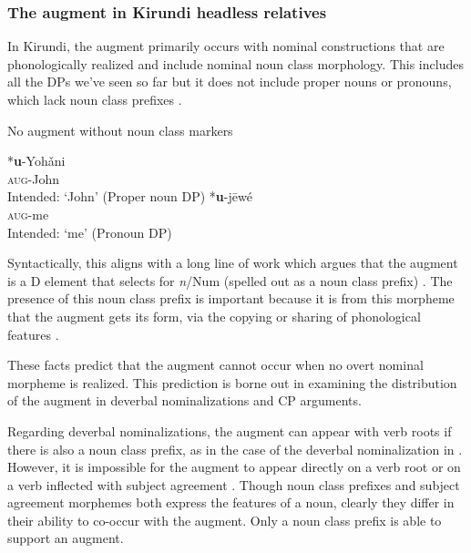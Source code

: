 \documentclass[output=paper,colorlinks,citecolor=brown
]{langscibook}
\begin{document}
 \subsubsection{The augment in Kirundi headless relatives}

In Kirundi, the augment primarily occurs with nominal constructions that are phonologically realized and include nominal noun class morphology. This includes all the DPs we've seen so far but it does not include proper nouns or pronouns, which lack noun class prefixes .

\ea No augment without noun class markers \label{ex:myers:noaugnonc}
\begin{xlist}
\ex \gll {}*{\bfseries  u}-Yohǎni\\
\textsc{aug}-John\\
\glt {}Intended: `John' \hfill{(Proper noun DP)}
\ex \gll {}*{\bfseries  u}-jēwé\\
\textsc{aug}-me\\
\glt {}Intended: `me' \hfill{(Pronoun DP)}
\end{xlist}
\z

Syntactically, this aligns with a long line of work which argues that the augment is a D element \citep{Ndayiragijeetal:2012} that selects for \emph{n}/Num (spelled out as a noun class prefix) \citep{FuchsvanderWal:2021}. The presence of this noun class prefix is important because it is from this morpheme that the augment gets its form, via the copying or sharing of phonological features \citep{Ntihirageza:2001,Niyondagara:1993}.

These facts predict that the augment cannot occur when no overt nominal morpheme is realized. This prediction is borne out in examining the distribution of the augment in deverbal nominalizations and CP arguments. 

Regarding deverbal nominalizations, the augment can appear with verb roots if there is also a noun class prefix, as in the case of the deverbal nominalization in . However, it is impossible for the augment to appear directly on a verb root  or on a verb inflected with subject agreement . Though noun class prefixes and subject agreement morphemes both express the features of a noun, clearly they differ in their ability to co-occur with the augment. Only a noun class prefix is able to support an augment.
\end{document}
